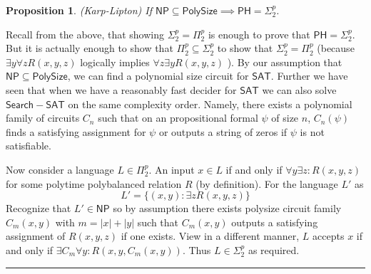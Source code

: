 \documentclass[twoside]{article}
\newtheorem{proposition}[theorem]{Proposition}
\newenvironment{proof}{{\bf Proof:}}{\hfill\rule{2mm}{2mm}}
\def\NP{\mathsf{NP}}
\def\PH{\mathsf{PH}}
\def\SAT{\mathsf{SAT}}
\def\PolySize{\mathsf{PolySize}}
\begin{document}
\begin{proposition}
(Karp-Lipton) If $\NP \subseteq \PolySize \implies \PH = \Sigma_2^p$.
\end{proposition}
\begin{proof}
Recall from the above, that showing $\Sigma_2^p = \Pi_2^p$ is enough to prove that $\PH = \Sigma_2^p$. But it is actually enough to show that $\Pi_2^p \subseteq \Sigma_2^p$ to show that $\Sigma_2^p = \Pi_2^p$ (because $\exists y\forall z R(x,y,z)$ logically implies $\forall z\exists y R(x,y,z)$ ). By our assumption that $\NP \subseteq \PolySize$, we can find a polynomial size circuit for $\SAT$. Further we have seen that when we have a reasonably fast decider for $\SAT$ we can also solve $\mathsf{Search-SAT}$ on the same complexity order. Namely, there exists a polynomial family of circuits $C_n$ such that on an propositional formal $\psi$ of size $n$, $C_n(\psi)$ finds a satisfying assignment for $\psi$ or outputs a string of zeros if $\psi$ is not satisfiable. 

Now consider a language $L \in \Pi_2^p$. An input $x \in L$ if and only if $\forall y \exists z: R(x,y,z)$ for some polytime polybalanced relation $R$ (by definition). For the language $L'$ as
\[L' = \{(x,y): \exists z R(x,y,z) \}\]
Recognize that $L' \in \NP$ so by assumption there exists polysize circuit family $C_m(x,y)$ with $m = |x| + |y|$ such that $C_m(x,y)$ outputs a satisfying assignment of $R(x,y,z)$ if one exists. View in a different manner,  $L$ accepts $x$ if and only if $\exists C_m \forall y: R(x,y, C_m(x,y))$. Thus $L \in \Sigma_2^p$ as required.  
\end{proof}
\end{document}
